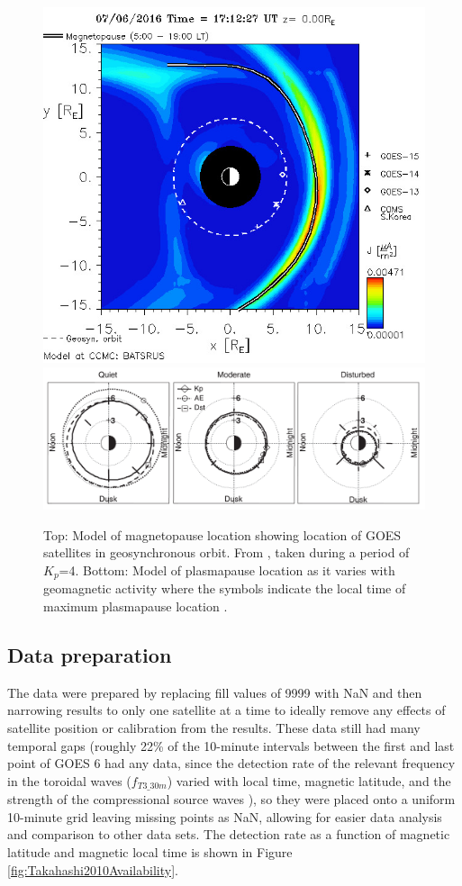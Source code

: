 \begin{figure}[htp!]
	\centering
	\includegraphics[width=0.9\linewidth]{Figures/iSWACygnetStreamer.jpg}
	\includegraphics[width=0.9\linewidth]{Figures/PlasmapauseLocation.png}
	\caption{Top: Model of magnetopause location showing location of GOES satellites in geosynchronous orbit. From \citep{CCMC}, taken during a period of $K_p$=4. Bottom: Model of plasmapause location as it varies with geomagnetic activity where the symbols indicate the local time of maximum plasmapause location \citep{OBrien2003EmpiricalPlasmapause}.}
	\label{fig:PlasmapauseLocation}
\end{figure}

\subsection{Data preparation}
The data were prepared by replacing fill values of 9999 with NaN and then narrowing results to only one satellite at a time to ideally remove any effects of satellite position or calibration from the results. These data still had many temporal gaps (roughly 22\% of the 10-minute intervals between the first and last point of GOES 6 had any data, since the detection rate of the relevant frequency in the toroidal waves ($f_{T3\_30m}$) varied with local time, magnetic latitude, and the strength of the compressional source waves \citep{Takahashi2010SolarCycleVariation}), so they were placed onto a uniform 10-minute grid leaving missing points as NaN, allowing for easier data analysis and comparison to other data sets. The detection rate as a function of magnetic latitude and magnetic local time is shown in Figure \ref{fig:Takahashi2010Availability}.

